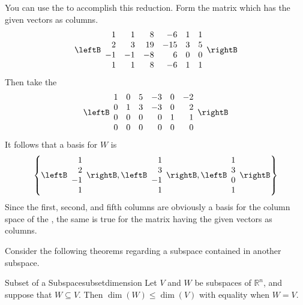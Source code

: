 \begin{solution}
You can use the \rref\; to accomplish this reduction. Form
the matrix which has the given vectors as columns. 
\begin{equation*}
\leftB
\begin{array}{rrrrrr}
1 & 1 & 8 & -6 & 1 & 1 \\ 
2 & 3 & 19 & -15 & 3 & 5 \\ 
-1 & -1 & -8 & 6 & 0 & 0 \\ 
1 & 1 & 8 & -6 & 1 & 1
\end{array}
\rightB
\end{equation*}
Then take the \rref\; 
\begin{equation*}
\leftB
\begin{array}{rrrrrr}
1 & 0 & 5 & -3 & 0 & -2 \\ 
0 & 1 & 3 & -3 & 0 & 2 \\ 
0 & 0 & 0 & 0 & 1 & 1 \\ 
0 & 0 & 0 & 0 & 0 & 0
\end{array}
\rightB
\end{equation*}
It follows that a basis for $W$ is 
\begin{equation*}
\left\{ \leftB 
\begin{array}{r}
1 \\ 
2 \\ 
-1 \\ 
1
\end{array}
\rightB ,\leftB 
\begin{array}{r}
1 \\ 
3 \\ 
-1 \\ 
1
\end{array}
\rightB ,\leftB 
\begin{array}{c}
1 \\ 
3 \\ 
0 \\ 
1
\end{array}
\rightB \right\}
\end{equation*}
Since the first, second, and fifth columns are
obviously a basis for the column space of the \rref, the same
is true for the matrix having the given vectors as columns. 
\end{solution}

Consider the following theorems regarding a subspace contained in another subspace. 

\begin{theorem}{Subset of a Subspace}{subsetdimension}
Let $V$ and $W$ be subspaces of $\mathbb{R}^n$, and suppose that $W\subseteq V$.
Then  $\dim(W) \leq \dim(V)$ with equality when $W=V$.
\end{theorem}

